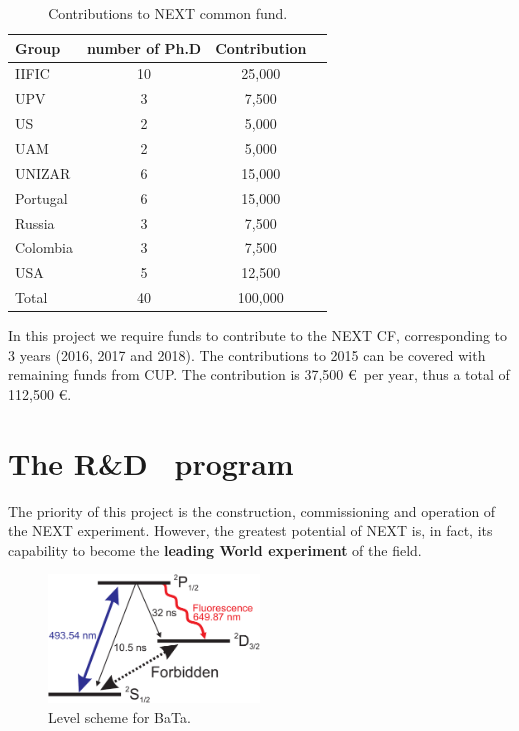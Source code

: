 \documentclass[a4paper,11pt,oneside]{article}
\begin{document}
\begin{table}[h!]
\begin{center}
\begin{tabular}{|l|c|c|c|}
\hline
Group &	number of Ph.D & 	Contribution \\
\hline
IIFIC &	10	& 25,000 \\
UPV	& 3 &	7,500 \\
US	& 2	& 5,000 \\
UAM	  & 2 & 	5,000 \\
UNIZAR	& 6	& 15,000 \\
Portugal 	& 6	& 15,000 \\
Russia	& 3	& 7,500 \\
Colombia	& 3	& 7,500 \\
USA	& 5 & 	12,500 \\
\hline
Total & 40& 100,000 \\
 \hline\hline
\end{tabular}  
\caption{Contributions to NEXT common fund.}
\label{tab.CFD}
\end{center}
\end{table} 

In this project we require funds to contribute to the NEXT CF, corresponding to 3 years (2016, 2017 and 2018). The contributions to 2015 can be covered with remaining funds from CUP. The contribution is
37,500 \euro\ per year, thus a total of 112,500 \euro. 
		
\section{\bf The R\&D \BATA\ program}
\label{sec.bata}
The priority of this project is the construction, commissioning and operation of the NEXT experiment. However, the greatest potential of NEXT is, in fact, its capability to become the {\bf leading World experiment} of the field. 

\begin{figure}
\centering
\includegraphics[width=0.5\textwidth]{img/levelscheme.pdf}
\caption{\label{fig.levelscheme} Level scheme for BaTa.} 
\end{figure}
	
\end{document}
